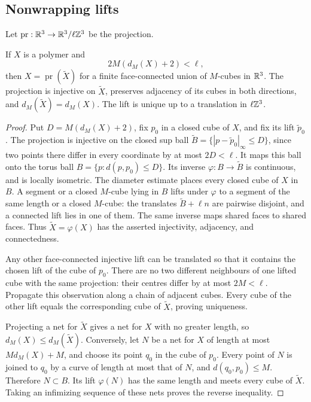 \subsection{Nonwrapping lifts}\label{subsec:polymer-lifts}

Let $\operatorname{pr}:\mathbb R^3\to\mathbb R^3/\ell\mathbb Z^3$ be the projection.
\begin{proposition}\label{prop:nonwrapping-polymer-lift}
If $X$ is a polymer and
\begin{equation}\label{eq:nonwrapping-polymer-condition}
 2M(d_M(X)+2)<\ell,
\end{equation}
then $X=\operatorname{pr}(\widetilde X)$ for a finite face-connected
union of $M$-cubes in $\mathbb R^3$. The projection is injective on
$\widetilde X$, preserves adjacency of its cubes in both directions,
and $d_M(\widetilde X)=d_M(X)$. The lift is unique up to a translation
in $\ell\mathbb Z^3$.
\end{proposition}

\begin{proof}
Put $D=M(d_M(X)+2)$, fix $p_0$ in a closed cube of $X$, and fix its
lift $\widetilde p_0$. The projection is injective on the closed sup
ball $\widetilde B=\{|p-\widetilde p_0|_\infty\le D\}$, since two
points there differ in every coordinate by at most $2D<\ell$.
It maps this ball onto the torus ball $B=\{p:d(p,p_0)\le D\}$.
Its inverse $\varphi:B\to\widetilde B$ is continuous, and is locally
isometric. The diameter estimate places every closed cube of $X$ in
$B$. A segment or a closed $M$-cube lying in $B$ lifts under
$\varphi$ to a segment of the same length or a closed $M$-cube:
the translates $\widetilde B+\ell n$ are pairwise disjoint, and a
connected lift lies in one of them. The same inverse maps shared
faces to shared faces. Thus $\widetilde X=\varphi(X)$ has the
asserted injectivity, adjacency, and connectedness.

Any other face-connected injective lift can be translated so that it
contains the chosen lift of the cube of $p_0$. There are no two
different neighbours of one lifted cube with the same projection:
their centres differ by at most $2M<\ell$. Propagate this observation
along a chain of adjacent cubes. Every cube of the other lift equals
the corresponding cube of $\widetilde X$, proving uniqueness.

Projecting a net for $\widetilde X$ gives a net for $X$ with no greater
length, so $d_M(X)\le d_M(\widetilde X)$. Conversely, let $N$ be a
net for $X$ of length at most $Md_M(X)+M$, and choose its point $q_0$
in the cube of $p_0$. Every point of $N$ is joined to $q_0$ by a
curve of length at most that of $N$, and $d(q_0,p_0)\le M$.
Therefore $N\subset B$. Its lift $\varphi(N)$ has the same length
and meets every cube of $\widetilde X$. Taking an infimizing sequence
of these nets proves the reverse inequality.
\end{proof}

